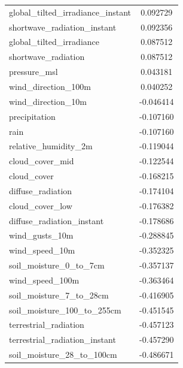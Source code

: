 \begin{table}[H]
\begin{tabular}{lc}
		global\_tilted\_irradiance\_instant    & 0.092729    \\ 
		shortwave\_radiation\_instant         & 0.092356    \\ 
		global\_tilted\_irradiance            & 0.087512    \\ 
		shortwave\_radiation                 & 0.087512    \\ 
		pressure\_msl                        & 0.043181    \\ 
		wind\_direction\_100m                 & 0.040252    \\ 
		wind\_direction\_10m                 & -0.046414   \\ 
		precipitation                      & -0.107160   \\ 
		rain                               & -0.107160   \\ 
		relative\_humidity\_2m               & -0.119044   \\ 
		cloud\_cover\_mid                    & -0.122544   \\ 
		cloud\_cover                        & -0.168215   \\ 
		diffuse\_radiation                  & -0.174104   \\ 
		cloud\_cover\_low                    & -0.176382   \\ 
		diffuse\_radiation\_instant          & -0.178686   \\ 
		wind\_gusts\_10m                     & -0.288845   \\ 
		wind\_speed\_10m                     & -0.352325   \\ 
		soil\_moisture\_0\_to\_7cm             & -0.357137   \\ 
		wind\_speed\_100m                    & -0.363464   \\ 
		soil\_moisture\_7\_to\_28cm            & -0.416905   \\ 
		soil\_moisture\_100\_to\_255cm         & -0.451545   \\ 
		terrestrial\_radiation              & -0.457123   \\ 
		terrestrial\_radiation\_instant      & -0.457290   \\ 
		soil\_moisture\_28\_to\_100cm          & -0.486671   \\
	\end{tabular}
\end{table}

